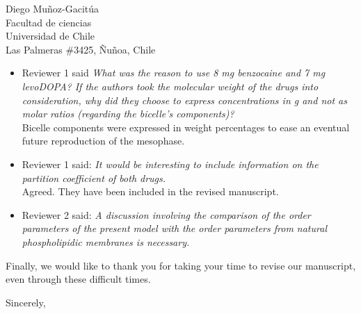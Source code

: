 \documentclass{letter}
\begin{document}
\begin{letter}{Diego Muñoz-Gacitúa\\ Facultad de ciencias \\ Universidad de
    Chile \\ Las Palmeras \#3425, Ñuñoa, Chile}
\begin{itemize}
\item Reviewer 1 said \textit{What was the reason to use 8 mg benzocaine and 7 mg levoDOPA? If the authors took the molecular weight of the drugs into consideration, why did they choose to express concentrations in g and not as molar ratios (regarding the bicelle’s components)?}\\
Bicelle components were expressed in weight percentages to ease an eventual future reproduction of the mesophase.
\item Reviewer 1 said: \textit{It would be interesting to include information on the partition coefficient of both drugs.}\\
  Agreed. They have been included in the revised manuscript.
  
  \item Reviewer 2 said: \textit{A discussion involving the comparison of the order parameters of the present model with the order parameters from natural phospholipidic membranes is necessary.}\\
  
  

 \end{itemize}

   Finally, we would like to thank you for taking your time to revise our
   manuscript, even through these difficult times.

   \closing{Sincerely,}

 \end{letter}
 
\end{document}
